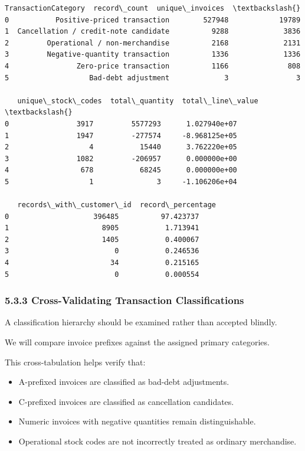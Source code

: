 \documentclass[11pt]{article}
\providecommand{\tightlist}{%
      \setlength{\itemsep}{0pt}\setlength{\parskip}{0pt}}
\begin{document}
    
    \begin{Verbatim}[commandchars=\\\{\}]
                    TransactionCategory  record\_count  unique\_invoices  \textbackslash{}
0           Positive-priced transaction        527948            19789   
1  Cancellation / credit-note candidate          9288             3836   
2         Operational / non-merchandise          2168             2131   
3         Negative-quantity transaction          1336             1336   
4                Zero-price transaction          1166              808   
5                   Bad-debt adjustment             3                3   

   unique\_stock\_codes  total\_quantity  total\_line\_value  \textbackslash{}
0                3917         5577293      1.027940e+07   
1                1947         -277574     -8.968125e+05   
2                   4           15440      3.762220e+05   
3                1082         -206957      0.000000e+00   
4                 678           68245      0.000000e+00   
5                   1               3     -1.106206e+04   

   records\_with\_customer\_id  record\_percentage  
0                    396485          97.423737  
1                      8905           1.713941  
2                      1405           0.400067  
3                         0           0.246536  
4                        34           0.215165  
5                         0           0.000554  
    \end{Verbatim}

    
    \subsubsection{5.3.3 Cross-Validating Transaction
Classifications}\label{cross-validating-transaction-classifications}

A classification hierarchy should be examined rather than accepted
blindly.

We will compare invoice prefixes against the assigned primary
categories.

This cross-tabulation helps verify that:

\begin{itemize}
\tightlist
\item
  A-prefixed invoices are classified as bad-debt adjustments.
\item
  C-prefixed invoices are classified as cancellation candidates.
\item
  Numeric invoices with negative quantities remain distinguishable.
\item
  Operational stock codes are not incorrectly treated as ordinary
  merchandise.
\end{itemize}
\end{document}
